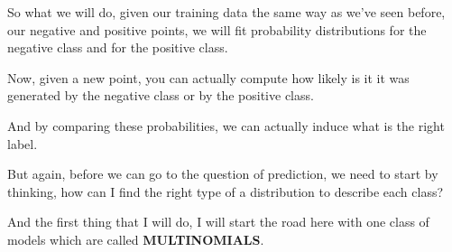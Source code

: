 \documentclass[a4paper, 12pt]{article}
\begin{document}
So what we will do, given our training data the same way as we've seen before,
our negative and positive points, we will fit probability distributions for the
negative class and for the positive class.

Now, given a new point, you can actually compute how likely is it it was
generated by the negative class or by the positive class.

And by comparing these probabilities, we can actually induce what is the right
label.

But again, before we can go to the question of prediction, we need to start by
thinking, how can I find the right type of a distribution to describe each
class?

And the first thing that I will do, I will start the road here with one class of
models which are called \textbf{MULTINOMIALS}.
\end{document}

